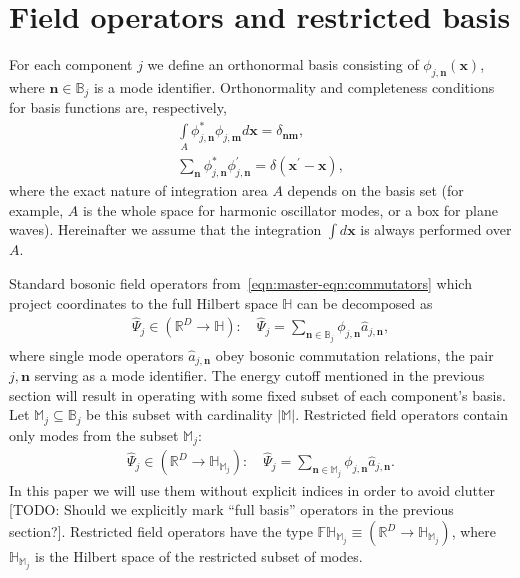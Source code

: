\documentclass[12pt,aip,jmp,amssymb,amsmath]{revtex4-1}
\begin{document}
\section{Field operators and restricted basis}
\label{sec:func-operators}

For each component $j$ we define an orthonormal basis consisting of $\phi_{j,\boldsymbol{n}}(\boldsymbol{x})$, where $\boldsymbol{n} \in \mathbb{B}_j$ is a mode identifier.
Orthonormality and completeness conditions for basis functions are, respectively,
\begin{align}
    \int\limits_A \phi_{j,\boldsymbol{n}}^* \phi_{j,\boldsymbol{m}} d\boldsymbol{x} = \delta_{\boldsymbol{n}\boldsymbol{m}}, \\
    \sum_{\boldsymbol{n}} \phi_{j,\boldsymbol{n}}^* \phi_{j,\boldsymbol{n}}^\prime = \delta(\boldsymbol{x}^\prime - \boldsymbol{x}),
\end{align}
where the exact nature of integration area $A$ depends on the basis set (for example, $A$ is the whole space for harmonic oscillator modes, or a box for plane waves).
Hereinafter we assume that the integration $\int d\boldsymbol{x}$ is always performed over $A$.

Standard bosonic field operators from~\ref{eqn:master-eqn:commutators} which project coordinates to the full Hilbert space $\mathbb{H}$ can be decomposed as
\begin{equation}\begin{split}
    \hat{\Psi}_j \in (\mathbb{R}^D \rightarrow \mathbb{H}): \quad
    \hat{\Psi}_j = \sum_{\boldsymbol{n} \in \mathbb{B}_j} \phi_{j,\boldsymbol{n}} \hat{a}_{j,\boldsymbol{n}},
\end{split}\end{equation}
where single mode operators $\hat{a}_{j,\boldsymbol{n}}$ obey bosonic commutation relations, the pair $j,\boldsymbol{n}$ serving as a mode identifier.
The energy cutoff mentioned in the previous section will result in operating with some fixed subset of each component's basis.
Let $\mathbb{M}_j \subseteq \mathbb{B}_j$ be this subset with cardinality $|\mathbb{M}|$.
Restricted field operators contain only modes from the subset $\mathbb{M}_j$:
\begin{equation}\begin{split}
    \hat{\Psi}_j \in (\mathbb{R}^D \rightarrow \mathbb{H}_{\mathbb{M}_j}): \quad
    \hat{\Psi}_j = \sum_{\boldsymbol{n} \in \mathbb{M}_j} \phi_{j,\boldsymbol{n}} \hat{a}_{j,\boldsymbol{n}}.
\end{split}\end{equation}
In this paper we will use them without explicit indices in order to avoid clutter [TODO: Should we explicitly mark ``full basis'' operators in the previous section?].
Restricted field operators have the type $\mathbb{FH}_{\mathbb{M}_j} \equiv (\mathbb{R}^D \rightarrow \mathbb{H}_{\mathbb{M}_j})$, where $\mathbb{H}_{\mathbb{M}_j}$ is the Hilbert space of the restricted subset of modes.
\end{document}
